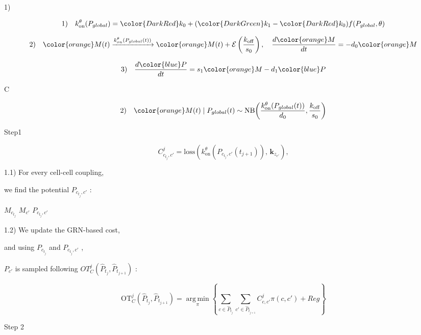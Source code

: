 \documentclass[a4paper, 11pt]{article}
\DeclareMathOperator*{\argmin}{arg\,min}
\begin{document}
1)

\begin{equation}
\label{kon_function_test}
1) \quad k^{\theta}_{\mathrm{on}}(P_{global})
 = {\color{DarkRed} k_{0}} + ({\color{DarkGreen} k_{1}}-{\color{DarkRed} k_{0}})f(P_{global},\theta)
\end{equation}

\begin{equation}
2) \quad 
{\color{orange}M(t)} \xrightarrow{k_{on}^\theta(P_{global}(t))} {\color{orange}M(t)} + \mathcal{E}\left(\frac{k_{\mathrm{off}}}{s_{0}}\right), \quad  
\frac{d{\color{orange}M}}{dt} = - d_{0}{\color{orange}M}
\end{equation}



\[
3) \quad \frac{d{\color{blue}P}}{dt} = s_{1} {\color{orange}M} - d_{1}{\color{blue}P}
\]

C

\begin{equation}
2) \quad {\color{orange}M(t)}\mid P_{global}(t)
 \sim \mathrm{NB}\!\left(
     \frac{k^{\theta}_{\mathrm{on}}(P_{global}(t))}{d_{0}},
     \frac{k_{\mathrm{off}}}{s_{0}}
   \right)
\label{eq:beta_qs}
\end{equation}

Step1

\begin{equation}
    \label{cost_matrix}
    C^j_{c_{t_j},c'} = \mathrm{loss}\!\left(k_{\mathrm{on}}^{\theta}\!\left(P_{c_{t_j},c'}(t_{j+1})\right),\, \mathbf{k}_{z_{c'}}\right),
\end{equation}


1.1) For every cell-cell coupling,

we find the potential $P_{c_{t_j},c'}$ :

$M_{c_{t_j}}$
$M_{c'}$
$P_{c_{t_j},c'}$

1.2) We update the GRN-based cost, 

and using $P_{c_{t_j}}$ and $P_{c_{t_j},c'}$ , 

$P_{c'}$ is sampled following $OT_C^{j}(\widehat P_{t_j}, \widehat P_{t_{j+1}})$ :

\begin{equation}
    \label{eq:proteins_update}
    \mathrm{OT}
_C^{j}(\widehat P_{t_j}, \widehat P_{t_{j+1}})=\argmin\limits_{\pi}\left\{\sum\limits_{{c \in \widehat P_{t_j}}} \sum\limits_{{c' \in \widehat P_{t_{j+1}}}} C^j_{c, c'} \pi(c, c') + Reg \right\}
\end{equation}

Step 2
\end{document}
